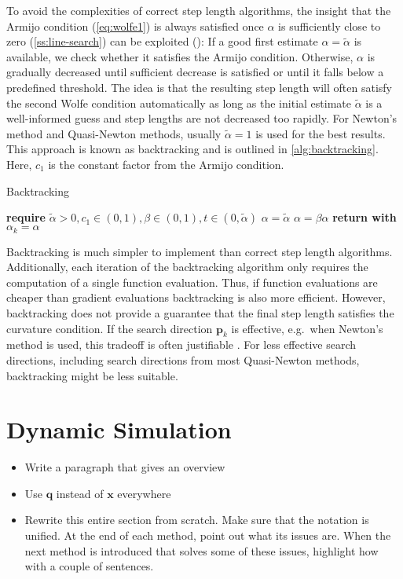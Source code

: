 To avoid the complexities of correct step length algorithms, the insight that the Armijo condition (\cref{eq:wolfe1}) is always satisfied 
once $\alpha$ is sufficiently close to zero (\cref{ss:line-search}) can be exploited (\cite{nocedal2006}): If a good first estimate $\alpha = 
\tilde{\alpha}$ is available,
we check whether it satisfies the Armijo condition. Otherwise, $\alpha$ is gradually decreased until sufficient decrease is satisfied or until
it falls below a predefined threshold. The idea is that the resulting step length will often satisfy the second Wolfe condition automatically 
as long as the initial estimate $\tilde{\alpha}$ is a well-informed guess and step lengths are not decreased too rapidly. For Newton's method
and Quasi-Newton methods, usually $\tilde{\alpha} = 1$ is used for the best results. This approach is known
as backtracking and is outlined in \cref{alg:backtracking}. Here, $c_1$ is the constant factor from the Armijo condition.

\begin{algorithm}
\caption{Backtracking}\label{alg:backtracking}
\begin{algorithmic}
\State \textbf{require } $\tilde{\alpha} > 0, c_1 \in (0, 1), \beta \in (0, 1), t \in (0, \tilde{\alpha})$
\State $\alpha = \tilde{\alpha}$
\State $\alpha = \beta \alpha$
\EndWhile
\State \textbf{return with } $\alpha_k = \alpha$
\EndProcedure
\end{algorithmic}
\end{algorithm}

Backtracking is much simpler to implement than correct step length algorithms. Additionally, each iteration of the backtracking algorithm
only requires the computation of a single function evaluation. Thus, if function evaluations are cheaper than gradient evaluations 
backtracking is also more efficient. However, backtracking does not provide a guarantee that the final step length satisfies the curvature
condition. If the search direction $\bm{p}_k$ is effective, e.g.\ when Newton's method is used, this tradeoff is often justifiable 
\cite{nocedal2006}. For less effective search directions, including search directions from most Quasi-Newton methods, backtracking might
be less suitable.

\section{Dynamic Simulation}\label{s:dynamic-simulation}
\begin{itemize}
    \item Write a paragraph that gives an overview
    \item Use $\bm{q}$ instead of $\bm{x}$ everywhere
    \item Rewrite this entire section from scratch. Make sure that the notation is unified. At the end of each method,
        point out what its issues are. When the next method is introduced that solves some of these issues, highlight
        how with a couple of sentences.
\end{itemize}


